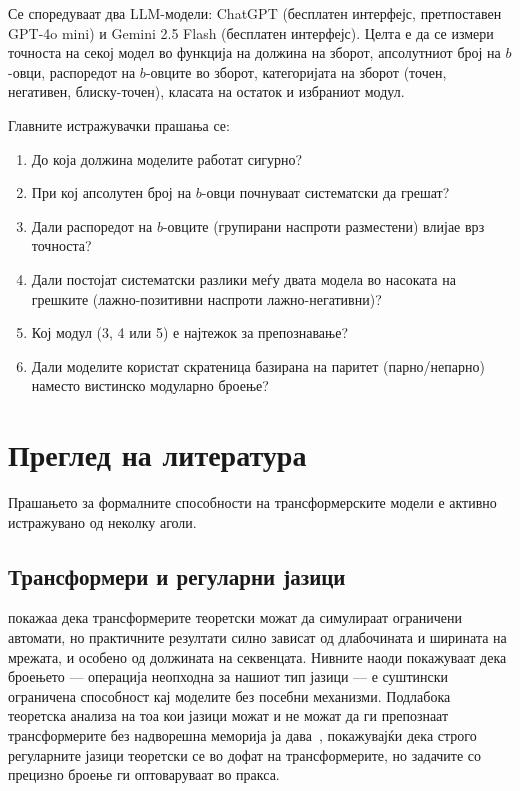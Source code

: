 \documentclass[12pt,a4paper]{article}
\theoremstyle{definition}
\begin{document}
Се споредуваат два LLM-модели: ChatGPT (бесплатен интерфејс, претпоставен GPT-4o mini) и Gemini 2.5 Flash (бесплатен интерфејс). Целта е да се измери точноста на секој модел во функција на должина на зборот, апсолутниот број на $b$-овци, распоредот на $b$-овците во зборот, категоријата на зборот (точен, негативен, блиску-точен), класата на остаток и избраниот модул.

Главните истражувачки прашања се:
\begin{enumerate}
  \item До која должина моделите работат сигурно?
  \item При кој апсолутен број на $b$-овци почнуваат систематски да грешат?
  \item Дали распоредот на $b$-овците (групирани наспроти разместени) влијае врз точноста?
  \item Дали постојат систематски разлики меѓу двата модела во насоката на грешките (лажно-позитивни наспроти лажно-негативни)?
  \item Кој модул (3, 4 или 5) е најтежок за препознавање?
  \item Дали моделите користат скратеница базирана на паритет (парно/непарно) наместо вистинско модуларно броење?
\end{enumerate}

\section{Преглед на литература}

Прашањето за формалните способности на трансформерските модели е активно истражувано од неколку аголи.

\vspace{0.8em}

\subsection{Трансформери и регуларни јазици}

\textcite{bhattamishra2020ability} покажаа дека трансформерите теоретски можат да симулираат ограничени автомати, но практичните резултати силно зависат од длабочината и ширината на мрежата, и особено од должината на секвенцата. Нивните наоди покажуваат дека броењето --- операција неопходна за нашиот тип јазици --- е суштински ограничена способност кај моделите без посебни механизми. Подлабока теоретска анализа на тоа кои јазици можат и не можат да ги препознаат трансформерите без надворешна меморија ја дава~\textcite{deletang2023chomsky}, покажувајќи дека строго регуларните јазици теоретски се во дофат на трансформерите, но задачите со прецизно броење ги оптоваруваат во пракса.
\end{document}
